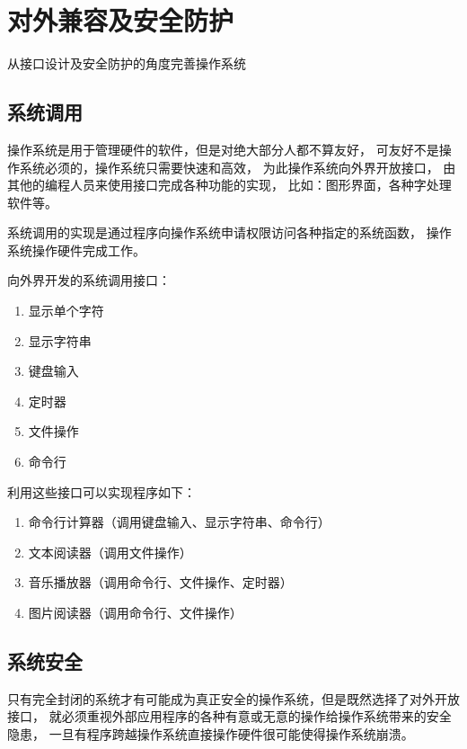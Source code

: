 \chapter{对外兼容及安全防护}

从接口设计及安全防护的角度完善操作系统

\section{系统调用}

操作系统是用于管理硬件的软件，但是对绝大部分人都不算友好，
可友好不是操作系统必须的，操作系统只需要快速和高效，
为此操作系统向外界开放接口，
由其他的编程人员来使用接口完成各种功能的实现，
比如：图形界面，各种字处理软件等。

系统调用的实现是通过程序向操作系统申请权限访问各种指定的系统函数，
操作系统操作硬件完成工作。

向外界开发的系统调用接口：
\begin{enumerate}
    \item 显示单个字符
    \item 显示字符串
    \item 键盘输入
    \item 定时器
    \item 文件操作
    \item 命令行
\end{enumerate}

利用这些接口可以实现程序如下：
\begin{enumerate}
    \item 命令行计算器（调用键盘输入、显示字符串、命令行）
    \item 文本阅读器（调用文件操作）
    \item 音乐播放器（调用命令行、文件操作、定时器）
    \item 图片阅读器（调用命令行、文件操作）
\end{enumerate}

\section{系统安全}

只有完全封闭的系统才有可能成为真正安全的操作系统，但是既然选择了对外开放接口，
就必须重视外部应用程序的各种有意或无意的操作给操作系统带来的安全隐患，
一旦有程序跨越操作系统直接操作硬件很可能使得操作系统崩溃。

